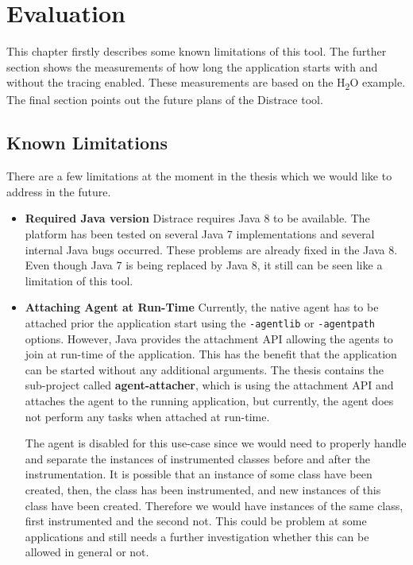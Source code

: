 \chapter{Evaluation}
\label{chap:evaluation}
This chapter firstly describes some known limitations of this tool. The further section shows the measurements of how long the application starts with and without the tracing enabled. These measurements are based on the H\textsubscript{2}O example. The final section points out the future plans of the Distrace tool.
\section{Known Limitations}
There are a few limitations at the moment in the thesis which we would like to address in the future.
\begin{itemize}
	\item \textbf{ Required Java version} \newline
	Distrace requires Java 8 to be available. The platform has been tested on several Java 7 implementations and several internal Java bugs occurred. These problems are already fixed in the Java 8. Even though Java 7 is being replaced by Java 8, it still can be seen like a limitation of this tool.
	\item \textbf{Attaching Agent at Run-Time} \newline
	Currently, the native agent has to be attached prior the application start using the \texttt{-agentlib} or \texttt{-agentpath} options. However, Java provides the attachment API allowing the agents to join at run-time of the application. This has the benefit that the application can be started without any additional arguments. The thesis contains the sub-project called \textbf{agent-attacher}, which is using the attachment API and attaches the agent to the running application, but currently, the agent does not perform any tasks when attached at run-time.
	
	The agent is disabled for this use-case since we would need to properly handle and separate the instances of instrumented classes before and after the instrumentation. It is possible that an instance of some class have been created, then, the class has been instrumented, and new instances of this class have been created. Therefore we would have instances of the same class, first instrumented and the second not. This could be problem at some applications and still needs a further investigation whether this can be allowed in general or not.
	
\end{itemize}




